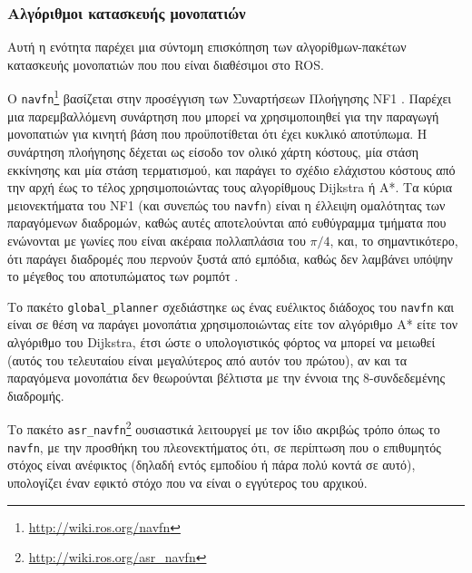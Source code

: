 \subsubsection{Αλγόριθμοι κατασκευής μονοπατιών}
\label{subsubsection:02_01_02:03_01}

Αυτή η ενότητα παρέχει μια σύντομη επισκόπηση των αλγορίθμων-πακέτων κατασκευής
μονοπατιών που που είναι διαθέσιμοι στο ROS.


O \texttt{navfn}\footnote{\url{http://wiki.ros.org/navfn}} βασίζεται στην
προσέγγιση των Συναρτήσεων Πλοήγησης NF1 \cite{Latombe1991}. Παρέχει μια
παρεμβαλλόμενη συνάρτηση που μπορεί να χρησιμοποιηθεί για την παραγωγή
μονοπατιών για κινητή βάση που προϋποτίθεται ότι έχει κυκλικό αποτύπωμα. Η
συνάρτηση πλοήγησης δέχεται ως είσοδο τον ολικό χάρτη κόστους, μία στάση
εκκίνησης και μία στάση τερματισμού, και παράγει το σχέδιο ελάχιστου κόστους
από την αρχή έως το τέλος χρησιμοποιώντας τους αλγορίθμους Dijkstra ή A*. Τα
κύρια μειονεκτήματα του NF1 (και συνεπώς του \texttt{navfn}) είναι η έλλειψη
ομαλότητας των παραγόμενων διαδρομών, καθώς αυτές αποτελούνται από ευθύγραμμα
τμήματα που ενώνονται με γωνίες που είναι ακέραια πολλαπλάσια του $\pi/4$, και,
το σημαντικότερο, ότι παράγει διαδρομές που περνούν ξυστά από εμπόδια, καθώς
δεν λαμβάνει υπόψην το μέγεθος του αποτυπώματος των ρομπότ \cite{Philippsen2004}.

Το πακέτο \texttt{global\_planner} σχεδιάστηκε ως ένας ευέλικτος διάδοχος του
\texttt{navfn} και είναι σε θέση να παράγει μονοπάτια χρησιμοποιώντας είτε τον
αλγόριθμο A* είτε τον αλγόριθμο του Dijkstra, έτσι ώστε ο υπολογιστικός φόρτος
να μπορεί να μειωθεί (αυτός του τελευταίου είναι μεγαλύτερος από αυτόν του
πρώτου), αν και τα παραγόμενα μονοπάτια δεν θεωρούνται βέλτιστα με την έννοια
της 8-συνδεδεμένης διαδρομής.

Το πακέτο \texttt{asr\_navfn}\footnote{\url{http://wiki.ros.org/asr\_navfn}}
ουσιαστικά λειτουργεί με τον ίδιο ακριβώς τρόπο όπως το \texttt{navfn}, με την
προσθήκη του πλεονεκτήματος ότι, σε περίπτωση που ο επιθυμητός στόχος είναι
ανέφικτος (δηλαδή εντός εμποδίου ή πάρα πολύ κοντά σε αυτό), υπολογίζει έναν
εφικτό στόχο που να είναι ο εγγύτερος του αρχικού.

